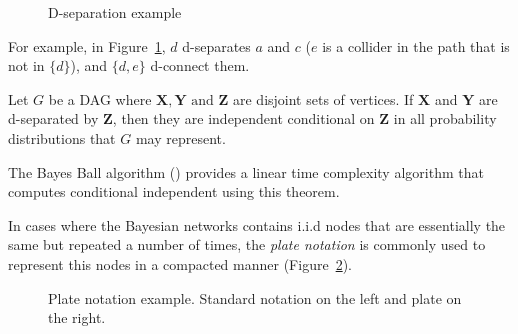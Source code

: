 \begin{figure}[t]
\centering
{}
\caption{D-separation example}\label{fig:d-sep}
\end{figure}

For example, in Figure~\ref{fig:d-sep}, \(d\) d-separates \(a\) and \(c\) (\(e\)
is a collider in the path that is not in \(\{d\}\)),
and \(\{d,e\}\) d-connect them.

\begin{theorem}\label{th:d-separation}
Let \(G\) be a DAG where \(\bm{X}, \bm{Y} \text{ and } \bm{Z}\)
are disjoint sets of vertices. If  \(\bm{X}\) and \(\bm{Y}\)
are d-separated by \(\bm{Z}\), then they are independent conditional
on \(\bm{Z}\) in all probability distributions that \(G\) may represent.
\end{theorem}

The Bayes Ball algorithm (\cite{bayes_ball}) provides a linear time complexity
algorithm that computes conditional independent using this theorem.


In cases where the Bayesian networks contains i.i.d nodes that are
essentially the same but repeated a number of times, the \emph{plate notation} is commonly used to represent this nodes in a compacted manner (Figure~\ref{fig:plate_notation}).

\begin{figure}[t]
\centering
{}
\caption{Plate notation example. Standard notation on the left and plate on the right.}\label{fig:plate_notation}
\end{figure}


